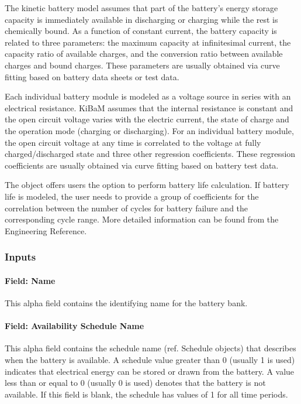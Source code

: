 The kinetic battery model assumes that part of the battery's energy storage capacity is immediately available in discharging or charging while the rest is chemically bound. As a function of constant current, the battery capacity is related to three parameters: the maximum capacity at infinitesimal current, the capacity ratio of available charges, and the conversion ratio between available charges and bound charges. These parameters are usually obtained via curve fitting based on battery data sheets or test data.

Each individual battery module is modeled as a voltage source in series with an electrical resistance. KiBaM assumes that the internal resistance is constant and the open circuit voltage varies with the electric current, the state of charge and the operation mode (charging or discharging). For an individual battery module, the open circuit voltage at any time is correlated to the voltage at fully charged/discharged state and three other regression coefficients. These regression coefficients are usually obtained via curve fitting based on battery test data.

The object offers users the option to perform battery life calculation. If battery life is modeled, the user needs to provide a group of coefficients for the correlation between the number of cycles for battery failure and the corresponding cycle range. More detailed information can be found from the Engineering Reference.

\subsubsection{Inputs}

\paragraph{Field: Name}\label{field-name-7-004}

This alpha field contains the identifying name for the battery bank.

\paragraph{Field: Availability Schedule Name}\label{field-availability-schedule-name-6-000}

This alpha field contains the schedule name (ref. Schedule objects) that describes when the battery is available. A schedule value greater than 0 (usually 1 is used) indicates that electrical energy can be stored or drawn from the battery. A value less than or equal to 0 (usually 0 is used) denotes that the battery is not available. If this field is blank, the schedule has values of 1 for all time periods.

